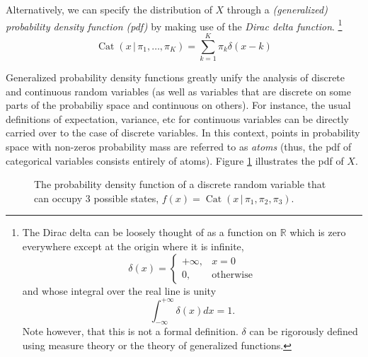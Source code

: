 \documentclass[final,3p,times,twocolumn]{elsarticle}
\DeclareMathOperator*{\Cat}{Cat}
\begin{document}
Alternatively, we can specify the distribution of $X$ through a \emph{(generalized) probability density function (pdf)} by making use of the \emph{Dirac delta function}.
\footnote{The Dirac delta can be loosely thought of as a function on $\mathbb{R}$ which is zero everywhere except at the origin where it is infinite,
\[\delta(x) = \left\{
\begin{array}{ll}
+\infty, & x = 0\\
0, & \mbox{otherwise}
\end{array} \right.\]
and whose integral over the real line is unity
\[ \int_{-\infty}^{+\infty}\delta(x)dx = 1.\]
Note however, that this is not a formal definition. $\delta$ can be rigorously defined using measure theory or the theory of generalized functions.}
\begin{equation}
\label{eqn:catpdf}
\Cat(x\,|\,\pi_1,\dots,\pi_K) = \sum_{k=1}^K \pi_k \delta(x - k)
\end{equation}

Generalized probability density functions greatly unify the analysis of discrete and continuous random variables (as well as variables that are discrete on some parts of the probabiliy space and continuous on others).
For instance, the usual definitions of expectation, variance, etc for continuous variables can be directly carried over to the case of discrete variables.
In this context, points in probability space with non-zeros probability mass are referred to as \emph{atoms} (thus, the pdf of categorical variables consists entirely of atoms).
Figure \ref{fig:pmf} illustrates the pdf of $X$.

\begin{figure}
\caption{The probability density function of a discrete random variable that can occupy 3 possible states, $f(x) = \Cat(x\,|\,\pi_1,\pi_2,\pi_3)$.}
\label{fig:pmf}
\end{figure}
\end{document}
